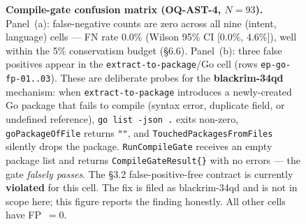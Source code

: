 \begin{figure}[ht]

\caption{%
  \textbf{Compile-gate confusion matrix (OQ-AST-4, $N{=}93$).}
  Panel~(a): false-negative counts are zero across all nine (intent, language) cells ---
  FN rate 0.0\% (Wilson 95\% CI [0.0\%, 4.6\%]), well within the 5\% conservatism
  budget (\S6.6).
  Panel~(b): three false positives appear in the \texttt{extract-to-package}/Go cell
  (rows \texttt{ep-go-fp-01..03}).  These are deliberate probes for the
  \textbf{blackrim-34qd} mechanism: when \texttt{extract-to-package} introduces a
  newly-created Go package that fails to compile (syntax error, duplicate field, or
  undefined reference), \texttt{go list -json .} exits non-zero,
  \texttt{goPackageOfFile} returns \texttt{""}, and
  \texttt{TouchedPackagesFromFiles} silently drops the package.
  \texttt{RunCompileGate} receives an empty package list and returns
  \texttt{CompileGateResult\{\}} with no errors --- the gate \emph{falsely passes}.
  The \S3.2 false-positive-free contract is currently \textbf{violated} for this cell.
  The fix is filed as blackrim-34qd and is not in scope here; this figure reports the
  finding honestly.  All other cells have FP~$= 0$.%
}
\label{fig:gate-confusion}
\end{figure}
